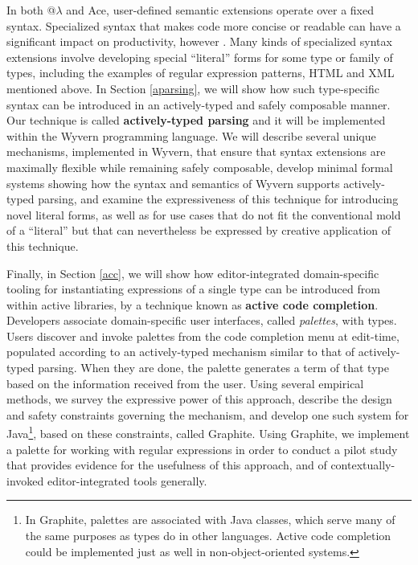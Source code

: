 In both @$\lambda$ and Ace, user-defined semantic extensions operate over a fixed syntax. Specialized syntax that makes code more concise or readable can have a significant impact on productivity, however \cite{syntax-productivity}. Many kinds of specialized syntax extensions involve developing special ``literal'' forms for some type or family of types, including the examples of regular expression patterns, HTML and XML mentioned above. In Section \ref{aparsing}, we will show how such type-specific syntax can be introduced in an actively-typed and safely composable manner. 
Our technique is called \textbf{actively-typed parsing} and it will be implemented within the Wyvern programming language. 
We will describe several unique mechanisms, implemented in Wyvern, that ensure that syntax extensions are maximally flexible while remaining safely composable, develop minimal formal systems showing how the syntax and semantics of Wyvern supports actively-typed parsing, and examine the expressiveness of this technique for introducing novel literal forms, as well as for use cases that do not fit the conventional mold of a ``literal'' but that can nevertheless be expressed by creative application of this technique.

Finally, in Section \ref{acc}, we will show how editor-integrated domain-specific tooling for instantiating expressions of a single type can be introduced from within active libraries, by a technique known as \textbf{active code completion}. Developers associate
domain-specific user interfaces, called \emph{palettes}, with types. Users discover and invoke palettes from the code completion menu at edit-time, populated according to an actively-typed mechanism similar to that of actively-typed parsing. When they are done, the palette generates a term of that type based on the information received from the user. Using several empirical
methods, we survey\- the expressive power of this approach, describe the design and safety constraints governing
the mechanism, and develop one such system for Java\footnote{In Graphite, palettes are associated with Java classes, which serve many of the same purposes as types do in other languages. Active code completion could be implemented just as well in non-object-oriented systems.}, based on these constraints, called Graphite. Using Graphite,
we implement a palette for working with regular expressions in order to conduct a pilot study that provides evidence for the usefulness of this approach, and of contextually-invoked editor-integrated tools generally.

